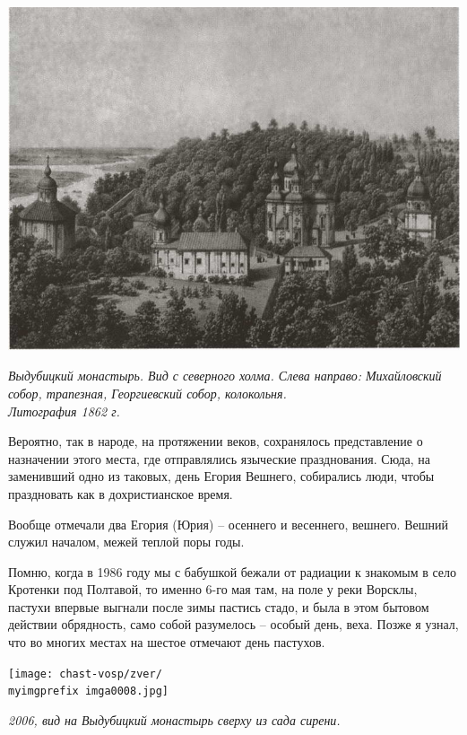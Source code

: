 \vspace*{\fill}
\begin{center}
\includegraphics[width=\linewidth]{chast-vosp/zver/1862-litografia.jpg}

\textit{Выдубицкий монастырь. Вид с северного холма. Слева направо: Михайловский собор, трапезная, Георгиевский собор, колокольня.\\
Литография 1862 г.}
\end{center}
\vspace*{\fill}
\newpage

Вероятно, так в народе, на протяжении веков, сохранялось представление о назначении этого места, где отправлялись языческие празднования. Сюда, на заменивший одно из таковых, день Егория Вешнего, собирались люди, чтобы праздновать как в дохристианское время.

Вообще отмечали два Егория (Юрия) – осеннего и весеннего, вешнего. Вешний служил началом, межей теплой поры годы. 

Помню, когда в 1986 году мы с бабушкой бежали от радиации к знакомым в село Кротенки под Полтавой, то именно 6-го мая там, на поле у реки Ворсклы, пастухи впервые выгнали после зимы пастись стадо, и была в этом бытовом действии обрядность, само собой разумелось – особый день, веха. Позже я узнал, что во многих местах на шестое отмечают день пастухов.
 

\begin{center}
\texttt{[image: chast-vosp/zver/\\myimgprefix imga0008.jpg]}

\textit{2006, вид на Выдубицкий монастырь сверху из сада сирени.}
\end{center}

